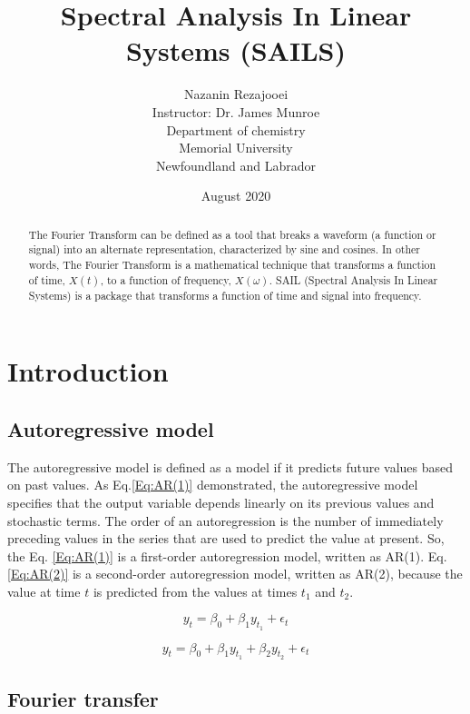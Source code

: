 \documentclass[12pt]{article}
\title {\textbf{Spectral Analysis In Linear Systems (SAILS)} \vspace{2 cm}}
\author{\huge \vspace{1.5 cm} Nazanin Rezajooei \\ \vspace{1 cm} Instructor: Dr. James Munroe \vspace{3 cm}\\  Department of chemistry \\ Memorial University \\ Newfoundland and Labrador}
\date{August 2020}
\begin{document}
\maketitle

\begin{abstract}
 The Fourier Transform can be defined as a tool that breaks a waveform (a function or signal) into an alternate representation, characterized by sine and cosines. In other words, The Fourier Transform is a mathematical technique that transforms a function of time, $X(t)$, to a function of frequency, $X(\omega)$. SAIL (Spectral Analysis In Linear Systems) is a package that transforms a function of time and signal into frequency. 
\end{abstract}

\newpage
\section{Introduction}
\subsection{Autoregressive model}

The autoregressive model is defined as a model if it predicts future values based on past values.
As Eq.\ref{Eq:AR(1)} demonstrated,  the autoregressive model specifies that the output variable depends linearly on its previous values and stochastic terms. The order of an autoregression is the number of immediately preceding values in the series that are used to predict the value at present. So, the Eq. \ref{Eq:AR(1)} is a first-order autoregression model, written as AR(1). Eq.\ref{Eq:AR(2)} is a second-order autoregression model, written as AR(2), because the value at time $t$ is predicted from the values at times $t_1$ and $t_2$.

\begin{equation}
    y_t = \beta_0 + \beta_1 y_{t_1} + \epsilon_t
    \label{Eq:AR(1)}
\end{equation}

\begin{equation}
    y_t = \beta_0 + \beta_1 y_{t_1} + \beta_2 y_{t_2} + \epsilon_t
    \label{Eq:AR(2)}
\end{equation}

\subsection{Fourier transfer}
\end{document}
